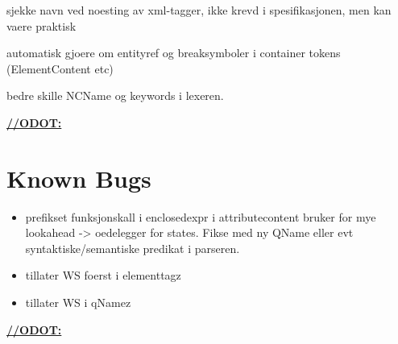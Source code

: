 sjekke navn ved noesting av xml-tagger, ikke krevd i spesifikasjonen, men kan vaere praktisk

automatisk gjoere om entityref og breaksymboler i container tokens (ElementContent etc)

bedre skille NCName og keywords i lexeren.

\underline{\textbf{\LARGE //ODOT:}}

\section{Known Bugs}
\label{sect:future:knownBugs}
\begin{itemize}
		\item prefikset funksjonskall i enclosedexpr i attributecontent bruker for mye lookahead -> oedelegger for states. Fikse med ny QName eller evt syntaktiske/semantiske predikat i parseren.
		\item tillater WS foerst i elementtagz
		\item tillater WS i qNamez
	\end{itemize}

\underline{\textbf{\LARGE //ODOT:}}
